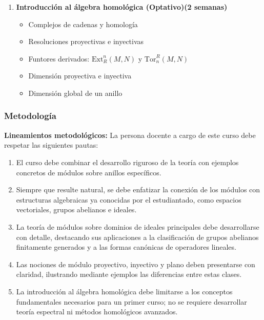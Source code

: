 \begin{refsection}
\begin{enumerate}
    \item \textbf{Introducción al álgebra homológica (Optativo)(2 semanas)}
    \begin{itemize}
        \item Complejos de cadenas y homología
        \item Resoluciones proyectivas e inyectivas
        \item Funtores derivados: $\mathrm{Ext}^n_R(M,N)$ y $\mathrm{Tor}_n^R(M,N)$
        \item Dimensión proyectiva e inyectiva
        \item Dimensión global de un anillo
    \end{itemize}
\end{enumerate}


\subsubsection*{Metodología}


\noindent \textbf{Lineamientos metodológicos:} La persona docente a cargo de este curso debe respetar las siguientes pautas:
\begin{enumerate}
    \item El curso debe combinar el desarrollo riguroso de la teoría con ejemplos concretos de módulos sobre anillos específicos.
    \item Siempre que resulte natural, se debe enfatizar la conexión de los módulos con estructuras algebraicas ya conocidas por el estudiantado, como espacios vectoriales, grupos abelianos e ideales.
    \item La teoría de módulos sobre dominios de ideales principales debe desarrollarse con detalle, destacando sus aplicaciones a la clasificación de grupos abelianos finitamente generados y a las formas canónicas de operadores lineales.
    \item Las nociones de módulo proyectivo, inyectivo y plano deben presentarse con claridad, ilustrando mediante ejemplos las diferencias entre estas clases.
    \item La introducción al álgebra homológica debe limitarse a los conceptos fundamentales necesarios para un primer curso; no se requiere desarrollar teoría espectral ni métodos homológicos avanzados.
\end{enumerate}


\end{refsection}
